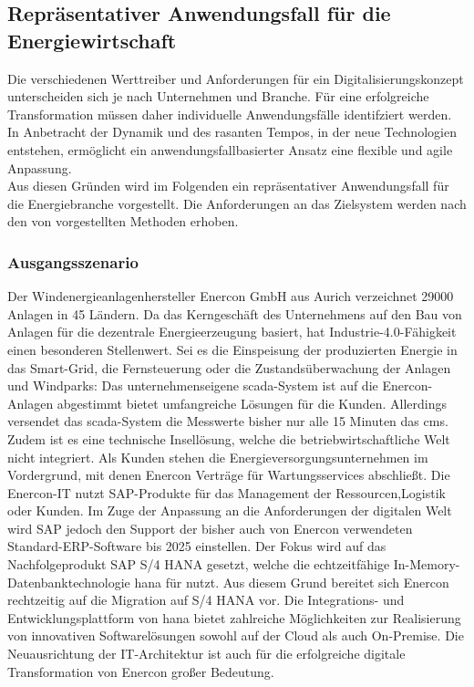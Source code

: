 \subsection{Repräsentativer Anwendungsfall für die Energiewirtschaft}\label{usecase}

Die verschiedenen Werttreiber und Anforderungen für ein Digitalisierungskonzept unterscheiden sich je nach Unternehmen und Branche.
Für eine erfolgreiche Transformation müssen daher individuelle Anwendungsfälle identifziert werden.
In Anbetracht der Dynamik und des rasanten Tempos, in der neue Technologien entstehen,
ermöglicht ein anwendungsfallbasierter Ansatz eine flexible und agile Anpassung. \citep[S. 31]{Acharya2019}
\\Aus diesen Gründen wird im Folgenden ein repräsentativer Anwendungsfall für die Energiebranche vorgestellt. Die Anforderungen an das Zielsystem werden nach den von \citet{Lauenroth2016} vorgestellten Methoden erhoben.

\subsubsection{Ausgangsszenario} \label{usecase}

Der Windenergieanlagenhersteller Enercon GmbH aus Aurich verzeichnet 29000 Anlagen in 45 Ländern. Da das Kerngeschäft des Unternehmens auf den Bau von Anlagen für die dezentrale Energieerzeugung basiert, hat Industrie-4.0-Fähigkeit einen besonderen Stellenwert. Sei es die Einspeisung der produzierten Energie in das Smart-Grid, die Fernsteuerung oder die Zustandsüberwachung der Anlagen und Windparks: Das unternehmenseigene \acf{scada}-System ist auf die Enercon-Anlagen abgestimmt bietet umfangreiche Lösungen für die Kunden. Allerdings versendet das \ac{scada}-System die Messwerte bisher nur alle 15 Minuten das \ac{cms}. Zudem ist es eine technische Insellösung, welche die betriebwirtschaftliche Welt nicht integriert. Als Kunden stehen die Energieversorgungsunternehmen im Vordergrund, mit denen Enercon Verträge für Wartungsservices abschließt. Die Enercon-IT nutzt SAP-Produkte für das Management der Ressourcen,Logistik oder Kunden. Im Zuge der Anpassung an die Anforderungen der digitalen Welt wird SAP jedoch den Support der bisher auch von Enercon verwendeten Standard-ERP-Software bis 2025 einstellen. Der Fokus wird auf das Nachfolgeprodukt SAP S/4 HANA gesetzt, welche die echtzeitfähige In-Memory-Datenbanktechnologie \acf{hana} für nutzt. Aus diesem Grund bereitet sich Enercon rechtzeitig auf die Migration auf S/4 HANA vor. Die Integrations- und Entwicklungsplattform von \ac{hana} bietet zahlreiche Möglichkeiten zur Realisierung von innovativen Softwarelösungen sowohl auf der Cloud als auch On-Premise. Die Neuausrichtung der IT-Architektur ist auch für die erfolgreiche digitale Transformation von Enercon großer Bedeutung.

